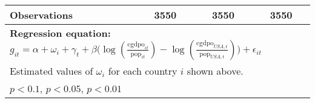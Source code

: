 \begin{table}[htbp]
\begin{tabular}{l*{3}{c}}
Observations    &     3550         &     3550         &     3550         \\
\bottomrule
\multicolumn{4}{l}{\footnotesize \textbf{Regression equation:} \(g_{it} = \alpha  + \omega_i + \gamma_t + \beta \big(\log (\frac{\textrm{cgdpo}_{it}}{\textrm{pop}_{it}} ) - \log (\frac{\textrm{cgdpo}_{USA,t}}{\textrm{pop}_{USA,t}}  ) \big) + \epsilon_{it}\)}\\
\multicolumn{4}{l}{\footnotesize Estimated values of \(\omega_i\) for each country \(i\) shown above.}\\
\multicolumn{4}{l}{\footnotesize \sym{*} \(p<0.1\), \sym{**} \(p<0.05\), \sym{***} \(p<0.01\)}\\
\end{tabular}
\end{table}
